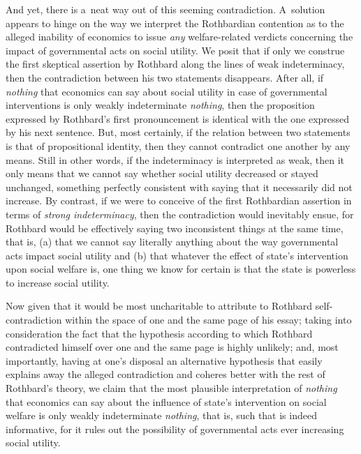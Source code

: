 And yet, there is a~neat way out of this seeming contradiction. A~solution appears to hinge on the way we interpret the Rothbardian contention as to the alleged inability of economics to issue \textit{any} welfare-related verdicts concerning the impact of governmental acts on social utility. We posit that if only we construe the first skeptical assertion by Rothbard along the lines of weak indeterminacy, then the contradiction between his two statements disappears. After all, if \textit{nothing} that economics can say about social utility in case of governmental interventions is only weakly indeterminate \textit{nothing}, then the proposition expressed by Rothbard's first pronouncement is identical with the one expressed by his next sentence. But, most certainly, if the relation between two statements is that of propositional identity, then they cannot contradict one another by any means. Still in other words, if the indeterminacy is interpreted as weak, then it only means that we cannot say whether social utility decreased or stayed unchanged, something perfectly consistent with saying that it necessarily did not increase. By contrast, if we were to conceive of the first Rothbardian assertion in terms of \textit{strong indeterminacy}, then the contradiction would inevitably ensue, for Rothbard would be effectively saying two inconsistent things at the same time, that is, (a) that we cannot say literally anything about the way governmental acts impact social utility and (b) that whatever the effect of state's intervention upon social welfare is, one thing we know for certain is that the state is powerless to increase social utility.



Now given that it would be most uncharitable to attribute to Rothbard self-contradiction within the space of one and the same page of his essay; taking into consideration the fact that the hypothesis according to which Rothbard contradicted himself over one and the same page is highly unlikely; and, most importantly, having at one's disposal an alternative hypothesis that easily explains away the alleged contradiction and coheres better with the rest of Rothbard's theory, we claim that the most plausible interpretation of \textit{nothing} that economics can say about the influence of state's intervention on social welfare is only weakly indeterminate \textit{nothing}, that is, such that is indeed informative, for it rules out the possibility of governmental acts ever increasing social utility.



